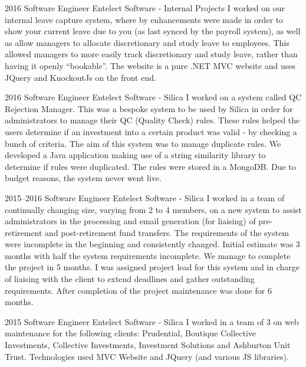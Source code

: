 \documentclass[]{friggeri-cv} %
\begin{document}
\begin{entrylist}

\entry
{2016} %
{Software Engineer}
{Entelect Software - Internal Projects}
{I worked on our internal leave capture system, where by enhancements were made in order to show your current leave due to you (as last synced by the payroll system), as well as allow managers to allocate discretionary and study leave to employees. This allowed managers to more easily track discretionary and study leave, rather than having it openly ``bookable''. The website is a pure .NET MVC website and uses JQuery and KnockoutJs on the front end.}

\entry
{2016} %
{Software Engineer}
{Entelect Software - Silica} %
{I worked on a system called QC Rejection Manager. This was a bespoke system to be used by Silica in order for administrators to manage their QC (Quality Check) rules. These rules helped the users determine if an investment into a certain product was valid - by checking a bunch of criteria. The aim of this system was to manage duplicate rules. We developed a Java application making use of a string similarity library to determine if rules were duplicated. The rules were stored in a MongoDB. Due to budget reasons, the system never went live.}

\entry
{2015--2016} %
{Software Engineer}
{Entelect Software - Silica} %
{I worked in a team of continually changing size, varying from 2 to 4 members, on a new system to assist administrators in the processing and email generation (for liaising) of pre-retirement and post-retirement fund transfers. The requirements of the system were incomplete in the beginning and consistently changed. Initial estimate was 3 months with half the system requirements incomplete. We manage to complete the project in 5 months. I was assigned project lead for this system and in charge of liaising with the client to extend deadlines and gather outstanding requirements. After completion of the project maintenance was done for 6 months.}

\entry
{2015} %
{Software Engineer}
{Entelect Software - Silica} %
{I worked in a team of 3 on web maintenance for the following clients: Prudential, Boutique Collective Investments, Collective Investments, Investment Solutions and Ashburton Unit Trust. Technologies used MVC Website and JQuery (and various JS libraries).}


\end{entrylist}
\end{document}
